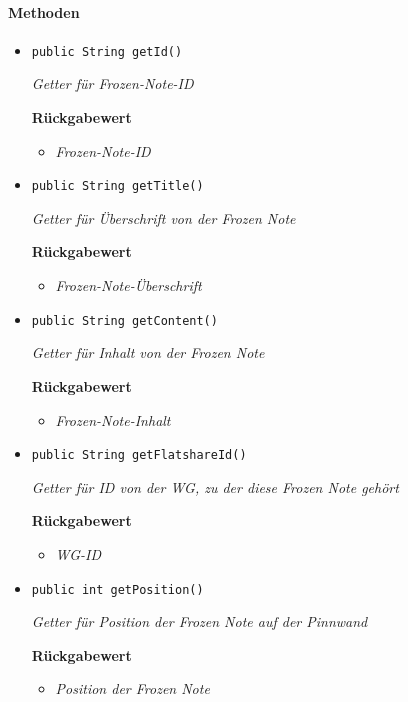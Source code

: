      \paragraph*{Methoden}
     \begin{itemize}
     	\item{\texttt{public String getId()}}
     	
     	\textit{Getter für Frozen-Note-ID}
     	
     	\textbf{Rückgabewert}
     	\begin{itemize}
     		\item\textit{Frozen-Note-ID}
     	\end{itemize}
     
     \item{\texttt{public String getTitle()}}
     	
     	\textit{Getter für Überschrift von der Frozen Note}
     	
     	\textbf{Rückgabewert}
     	\begin{itemize}
     		\item\textit{Frozen-Note-Überschrift}
     	\end{itemize}
     
     \item{\texttt{public String getContent()}}
     	
     	\textit{Getter für Inhalt von der Frozen Note}
     	
     	\textbf{Rückgabewert}
     	\begin{itemize}
     		\item\textit{Frozen-Note-Inhalt}
     	\end{itemize}
     
     \item{\texttt{public String getFlatshareId()}}
     	
     	\textit{Getter für ID von der WG, zu der diese Frozen Note gehört}
     	
     	\textbf{Rückgabewert}
     	\begin{itemize}
     		\item\textit{WG-ID}
     	\end{itemize}
     
     \item{\texttt{public int getPosition()}}
     	
     	\textit{Getter für Position der Frozen Note auf der Pinnwand}
     	
     	\textbf{Rückgabewert}
     	\begin{itemize}
     		\item\textit{Position der Frozen Note}
     	\end{itemize}
     \end{itemize}
